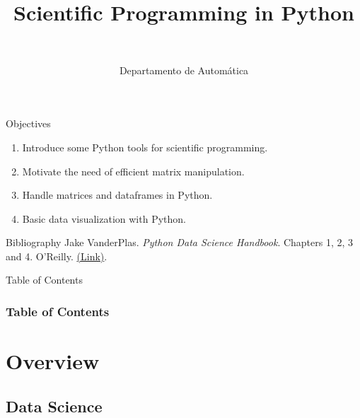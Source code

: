 \documentclass[10pt,compress]{beamer} %
\title[Scientific Programming]{Scientific Programming in Python}
\author{\asignatura\\\carrera}
\institute{}
\date{Departamento de Automática}
\begin{document}
{\titlepageBlue
    \begin{frame}
        \titlepage
    \end{frame}
}

\begin{frame}[plain]{}
	\begin{block}{Objectives}
		\begin{enumerate}
		\item Introduce some Python tools for scientific programming.
		\item Motivate the need of efficient matrix manipulation.
		\item Handle matrices and dataframes in Python.
		\item Basic data visualization with Python.
		\end{enumerate}
	\end{block}

   \begin{block}{Bibliography}
       Jake VanderPlas. \textit{Python Data Science Handbook}. Chapters 1, 2, 3 and 4. O'Reilly. \href{https://jakevdp.github.io/PythonDataScienceHandbook/}{(Link)}.
   \end{block}

\end{frame}

{
\begin{frame}[shrink]{Table of Contents}
 \frametitle{Table of Contents}
 \begin{multicols}{2}
 \tableofcontents
 \end{multicols}
\end{frame}
}

\section{Overview}

\subsection{Data Science}
\end{document}
